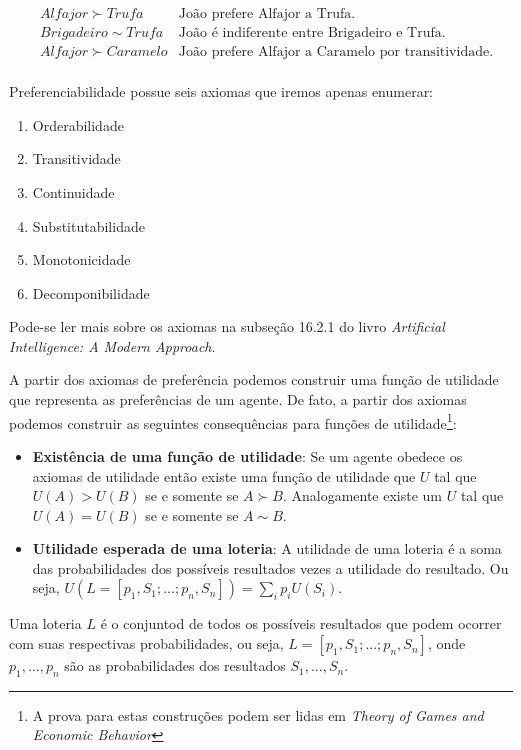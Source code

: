 \documentclass[a4paper,10pt]{article}
\theoremstyle{plain}
\begin{document}
\begin{align*}
  &Alfajor \succ Trufa &\text{João prefere Alfajor a Trufa.} \\
  &Brigadeiro \sim Trufa &\text{João é indiferente entre Brigadeiro e Trufa.} \\
  &Alfajor \succ Caramelo &\text{João prefere Alfajor a Caramelo por transitividade.}\\
\end{align*}

Preferenciabilidade possue seis axiomas que iremos apenas enumerar:

\begin{enumerate}
  \item Orderabilidade
  \item Transitividade
  \item Continuidade
  \item Substitutabilidade
  \item Monotonicidade
  \item Decomponibilidade
\end{enumerate}

Pode-se ler mais sobre os axiomas na subseção 16.2.1 do livro \textit{Artificial Intelligence: A
Modern Approach}\cite{aima}.

A partir dos axiomas de preferência podemos construir uma função de utilidade que representa as
preferências de um agente. De fato, a partir dos axiomas podemos construir as seguintes
consequências para funções de utilidade\footnote{A prova para estas construções podem ser lidas em
\textit{Theory of Games and Economic Behavior}\cite{neumann-morgenstern}}:

\begin{itemize}
  \item \textbf{Existência de uma função de utilidade}: Se um agente obedece os axiomas de
    utilidade então existe uma função de utilidade que $U$ tal que $U(A) > U(B)$ se e somente se
    $A \succ B$. Analogamente existe um $U$ tal que $U(A) = U(B)$ se e somente se $A \sim B$.
  \item \textbf{Utilidade esperada de uma loteria}: A utilidade de uma loteria é a soma das
    probabilidades dos possíveis resultados vezes a utilidade do resultado. Ou seja, $U(L=[p_1,S_1;
    ...;p_n,S_n]) = \sum_i p_iU(S_i)$.
\end{itemize}

Uma loteria $L$ é o conjuntod de todos os possíveis resultados que podem ocorrer com suas
respectivas probabilidades, ou seja, $L = [p_1,S_1;...;p_n,S_n]$, onde $p_1,...,p_n$ são as
probabilidades dos resultados $S_1,...,S_n$.
\end{document}

